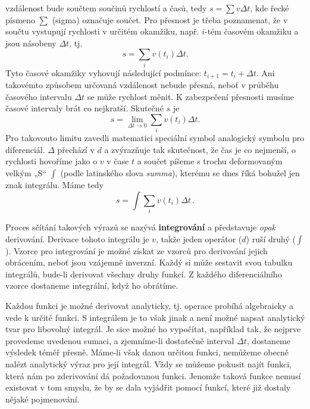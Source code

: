     vzdálenost bude součtem součinů rychlostí a časů, tedy \(s=\sum v\Delta t\), kde řecké písmeno 
    \(\sum\) (sigma) označuje součet. Pro přesnost je třeba poznamenat, že v součtu vystupují 
    rychlosti v určitém okamžiku, např. \(i\)-tém časovém okamžiku a jsou násobeny \(\Delta t\), tj.
    \begin{equation}\label{fyz:eq123}
      s = \sum_{i}v(t_i)\Delta t.
    \end{equation}
    Tyto časové okamžiky vyhovují následující podmínce: \(t_{i+1} = t_i + \Delta t\). Ani takovémto 
    způsobem určovaná vzdálenost nebude přesná, neboť v průběhu časového intervalu \(\Delta t\) se 
    může rychlost měnit. K zabezpečení přesnosti musíme časové intervaly brát co nejkratší. 
    Skutečné \(s\) je
    \begin{equation}\label{fyz:eq124}
      s = \lim_{\Delta t\to0}\sum_{i}v(t_i)\Delta t.
    \end{equation}
    Pro takovouto limitu zavedli matematici speciální symbol analogický symbolu pro diferenciál.    
    \(\Delta\) přechází v \(d\) a zvýrazňuje tak skutečnost, že čas je co nejmenší, o rychlosti 
    hovoříme jako o \(v\) v čase \(t\) a součet píšeme s trochu deformovaným velkým „S“ \(\int\) 
    (podle latinského slova \emph{summa}), kterému se dnes říká bohužel jen znak integrálu. Máme 
    tedy
    \begin{equation}\label{fyz:eq125}
      \boxed{s = \int\sum_{i}v(t_i)\Delta t}\,.
    \end{equation}
    
    Proces sčítání takových výrazů se nazývá \textbf{integrování} a představuje \emph{opak} 
    derivování. Derivace tohoto integrálu je \(v\), takže jeden operátor (\(d\)) ruší druhý 
    (\(\int\)). Vzorce pro integrování je možné získat ze vzorců pro derivování jejich obrácením, 
    neboť jsou vzájemně inverzní. Každý si může sestavit svou tabulku integrálů, bude-li derivovat 
    všechny druhy funkcí. Z každého diferenciálního vzorce dostaneme integrální, když ho obrátíme.
    
    Každou funkci je možné derivovat analyticky, tj. operace probíhá algebraicky a vede k určité 
    funkci. S integrálem je to však jinak a není možné napsat analytický tvar pro libovolný 
    integrál. Je sice možné ho vypočítat, například tak, že nejprve provedeme uvedenou sumaci, a 
    zjemníme-li dostatečně interval \(\Delta t\), dostaneme výsledek téměř přesně. Máme-li však 
    danou určitou funkci, nemůžeme obecně nalézt analytický výraz pro její integrál. Vždy se můžeme 
    pokusit najít funkci, která nám po zderivování dá požadovanou funkci. Jenomže taková funkce 
    nemusí existovat v tom smyslu, že by se dala vyjádřit pomocí funkcí, které již dostaly nějaké 
    pojmenování.
    

